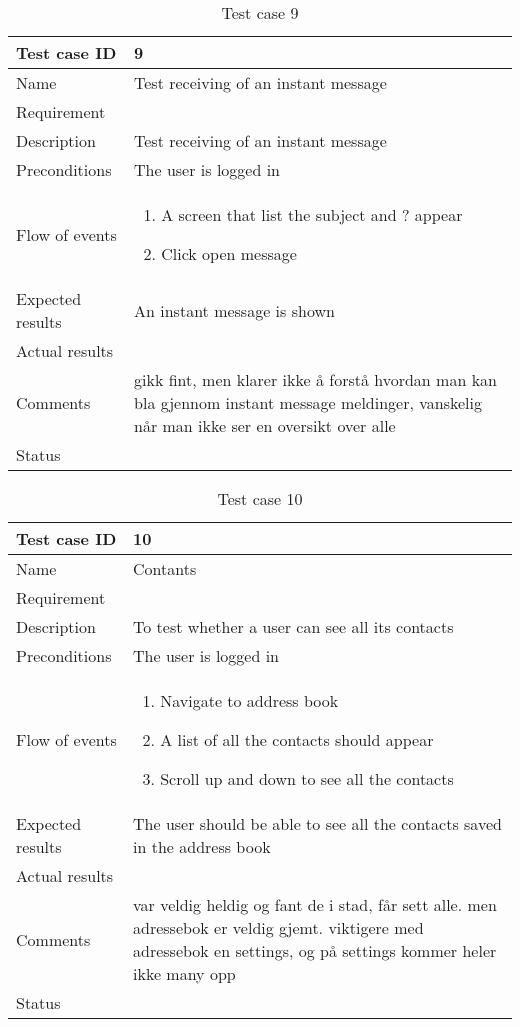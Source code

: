 \begin{table}
\begin{tabular}{l|p{10cm}}
Test case ID & 9 \\ \hline
Name & Test receiving of an instant message\\ \hline
Requirement & \\ \hline
Description & Test receiving of an instant message\\ \hline
Preconditions & The user is logged in\\ \hline
Flow of events & 
\begin{enumerate}
\item{}A screen that list the subject and ? appear
\item{}Click open message
\end{enumerate} \\ \hline
Expected results & An instant message is shown\\ \hline \hline
Actual results & \\ \hline
Comments & gikk fint, men klarer ikke å forstå hvordan man kan bla gjennom instant message meldinger, vanskelig når man ikke ser en oversikt over alle\\ \hline
Status & 
\end{tabular}
\caption{Test case 9} \label{tab:case9}
\end{table}

\begin{table}
\begin{tabular}{l|p{10cm}}
Test case ID & 10 \\ \hline
Name & Contants\\ \hline
Requirement & \\ \hline
Description & To test whether a user can see all its contacts\\ \hline
Preconditions & The user is logged in\\ \hline
Flow of events & 
\begin{enumerate}
\item{}Navigate to address book
\item{}A list of all the contacts should appear
\item{}Scroll up and down to see all the contacts
\end{enumerate} \\ \hline
Expected results & The user should be able to see all the contacts saved in the address book\\ \hline \hline
Actual results & \\ \hline
Comments & var veldig heldig og fant de i stad, får sett alle. men adressebok er veldig gjemt. viktigere med adressebok en settings, og på settings kommer heler ikke many opp \\ \hline
Status & 
\end{tabular}
\caption{Test case 10} \label{tab:case10}
\end{table}

